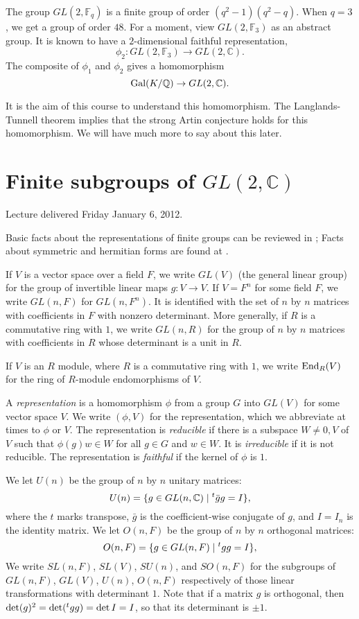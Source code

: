 \documentclass{llncs}
\def\op#1{{\hbox{#1}}}
\newcommand{\ring}[1]{\mathbb{#1}}
\def\newterm#1{{\it #1}}
\def\t#1{\hbox{}^t#1}
\begin{document}
The group $GL(2,\ring{F}_q)$ is a finite group of order
$(q^2-1)(q^2-q)$.  When $q=3$, we get a group of order $48$.  For a
moment, view $GL(2,\ring{F}_3)$ as an abstract group.  It is known
to have a $2$-dimensional faithful representation,
\[
\phi_2 : GL(2,\ring{F}_3) \to GL(2,\ring{C}).
\]
The composite of $\phi_1$ and $\phi_2$ gives a homomorphism
\[
\op{Gal}(K/\ring{Q}) \to GL(2,\ring{C}).
\]

It is the aim of this course to understand this homomorphism.  The
Langlands-Tunnell theorem implies that the strong Artin conjecture
holds for this homomorphism.  We will have much more to say about this
later.


\newpage
\section{Finite subgroups of $GL(2,\ring{C})$}

Lecture delivered Friday January 6, 2012.


Basic facts about the representations of finite groups can be reviewed
in \cite[p.~326, Sec. VII.4]{knapp-basic}; Facts about symmetric and
hermitian 
forms are found at \cite[p.~250,~Sec.~VI.2,~VI.4]{knapp-basic}.

If $V$ is a vector space over a field $F$, we write $GL(V)$ (the
general linear group) for the group of invertible linear maps $g:V\to
V$.  If $V=F^n$ for some field $F$, we write $GL(n,F)$ for
$GL(n,F^n)$.  It is identified with the set of $n$ by $n$ matrices
with coefficients in $F$ with nonzero determinant.  More generally, if
$R$ is a commutative ring with $1$, we write $GL(n,R)$ for the group
of $n$ by $n$ matrices with coefficients in $R$ whose determinant is a
unit in $R$.

If $V$ is an $R$ module, where $R$ is a commutative ring with $1$, 
we write $\op{End}_R(V)$ for the ring of $R$-module endomorphisms of $V$.

A \newterm{representation} is a homomorphism $\phi$ from a group $G$
into $GL(V)$ for some vector space $V$.  We write $(\phi,V)$ for the
representation, which we abbreviate at times to $\phi$ or $V$.  
The representation is \newterm{reducible} if there is
a subspace $W\ne 0,V$ of $V$ such that $\phi(g)w\in W$ for all $g\in
G$ and $w\in W$.  It is \newterm{irreducible} if it is not reducible.
The representation is \newterm{faithful} if the kernel of $\phi$ is
$1$.

We let $U(n)$ be the group of $n$ by $n$ unitary matrices:
\[
U(n) = \{ g \in GL(n,\ring{C})  \mid \t{\bar g} g = I\},
\]
where the $t$ marks transpose, $\bar g$ is the coefficient-wise
conjugate of $g$, and $I=I_n$ is the identity matrix.  We let $O(n,F)$
be the group of $n$ by $n$ orthogonal matrices:
\[
O(n,F) = \{ g \in GL(n,F) \mid \t{g} g = I\},
\]
We write $SL(n,F)$, $SL(V)$, $SU(n)$, and $SO(n,F)$ for the subgroups
of $GL(n,F)$, $GL(V)$, $U(n)$, $O(n,F)$ respectively of those linear
transformations with determinant $1$.  Note that if a matrix $g$ is orthogonal,
then $\det(g)^2 = \det(\t{g}g) = \det{I} = I$, so that its determinant is $\pm 1$.
\end{document}
